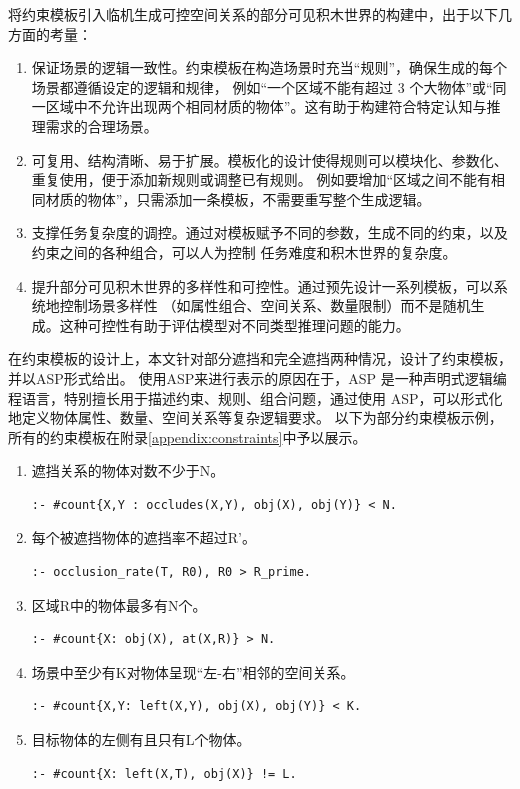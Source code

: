 将约束模板引入临机生成可控空间关系的部分可见积木世界的构建中，出于以下几方面的考量：
\begin{enumerate}[nosep]
\item 保证场景的逻辑一致性。约束模板在构造场景时充当“规则”，确保生成的每个场景都遵循设定的逻辑和规律，
例如“一个区域不能有超过 3 个大物体”或“同一区域中不允许出现两个相同材质的物体”。这有助于构建符合特定认知与推理需求的合理场景。
\item 可复用、结构清晰、易于扩展。模板化的设计使得规则可以模块化、参数化、重复使用，便于添加新规则或调整已有规则。
例如要增加“区域之间不能有相同材质的物体”，只需添加一条模板，不需要重写整个生成逻辑。
\item 支撑任务复杂度的调控。通过对模板赋予不同的参数，生成不同的约束，以及约束之间的各种组合，可以人为控制
任务难度和积木世界的复杂度。
\item 提升部分可见积木世界的多样性和可控性。通过预先设计一系列模板，可以系统地控制场景多样性
（如属性组合、空间关系、数量限制）而不是随机生成。这种可控性有助于评估模型对不同类型推理问题的能力。
\end{enumerate}

在约束模板的设计上，本文针对部分遮挡和完全遮挡两种情况，设计了约束模板，并以ASP形式给出。
使用ASP来进行表示的原因在于，ASP 是一种声明式逻辑编程语言，特别擅长用于描述约束、规则、组合问题，通过使用 ASP，可以形式化地定义物体属性、数量、空间关系等复杂逻辑要求。
以下为部分约束模板示例，所有的约束模板在附录\ref{appendix:constraints}中予以展示。
\begin{enumerate}[nosep]
\item 遮挡关系的物体对数不少于N。
\begin{lstlisting}
:- #count{X,Y : occludes(X,Y), obj(X), obj(Y)} < N.
\end{lstlisting}
\item 每个被遮挡物体的遮挡率不超过R'。
\begin{lstlisting}
:- occlusion_rate(T, R0), R0 > R_prime.
\end{lstlisting}
\item 区域R中的物体最多有N个。
\begin{lstlisting}
:- #count{X: obj(X), at(X,R)} > N.
\end{lstlisting}
\item 场景中至少有K对物体呈现“左-右”相邻的空间关系。
\begin{lstlisting}
:- #count{X,Y: left(X,Y), obj(X), obj(Y)} < K.
\end{lstlisting}
\item 目标物体的左侧有且只有L个物体。
\begin{lstlisting}
:- #count{X: left(X,T), obj(X)} != L.
\end{lstlisting}
\end{enumerate}
